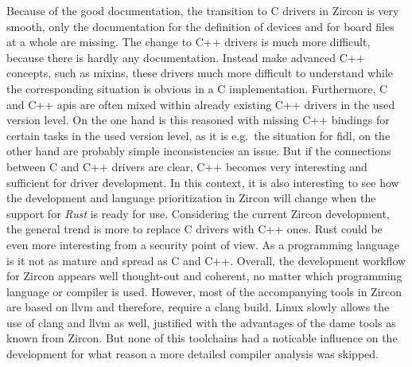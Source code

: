 Because of the good documentation, the transition to C drivers in Zircon is very smooth, only the documentation for the definition of devices and for board files at a whole are missing.
The change to C++ drivers is much more difficult, because there is hardly any documentation.
Instead make advanced C++ concepts, such as mixins, these drivers much more difficult to understand while the corresponding situation is obvious in a C implementation.
Furthermore, C and C++ \acp{api} are often mixed within already existing C++ drivers in the used version level.
On the one hand is this reasoned with missing C++ bindings for certain tasks in the used version level, as it is e.g.\ the situation for \ac{fidl}, on the other hand are probably simple inconsistencies an issue.
But if the connections between C and C++ drivers are clear, C++ becomes very interesting and sufficient for driver development.
In this context, it is also interesting to see how the development and language prioritization in Zircon will change when the support for \textit{Rust} is ready for use.
Considering the current Zircon development, the general trend is more to replace C drivers with C++ ones.
Rust could be even more interesting from a security point of view.
As a programming language is it not as mature and spread as C and C++.
Overall, the development workflow for Zircon appears well thought-out and coherent, no matter which programming language or compiler is used.
However, most of the accompanying tools in Zircon are based on \ac{llvm} and therefore, require a clang build.
Linux slowly allows the use of clang and \ac{llvm} as well, justified with the advantages of the dame tools as known from Zircon.
But none of this toolchains had a noticable influence on the development for what reason a more detailed compiler analysis was skipped.

